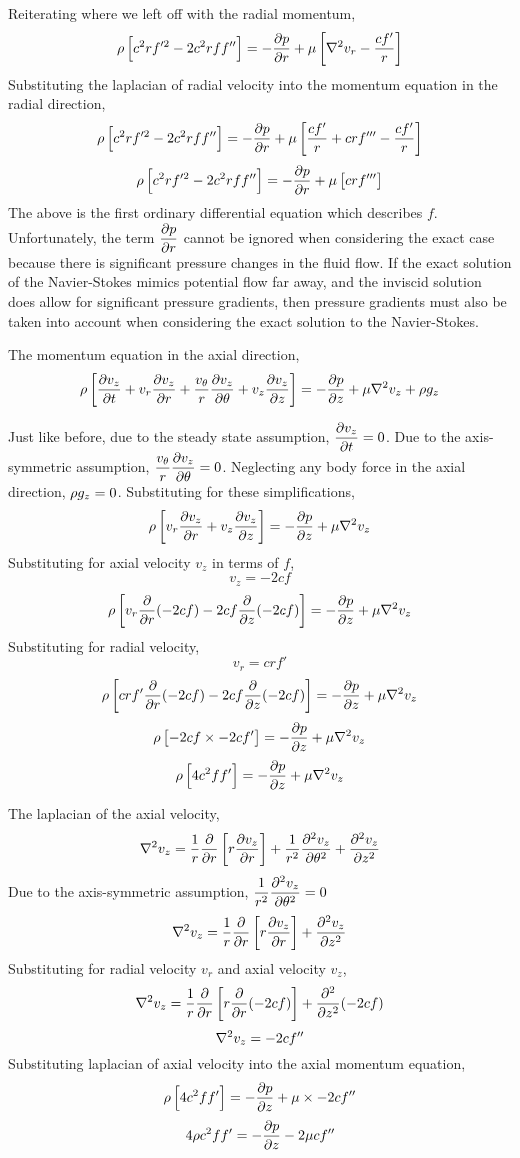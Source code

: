 \documentclass[class=report, 12pt, crop=false]{standalone}
\begin{document}
\begin{center}
Reiterating where we left off with the radial momentum,
$$\rho\left[c^2rf'^2 - 2c^2rff''\right] = -\frac{\partial p}{\partial r} + \mu\left[\nabla^2v_r - \frac{cf'}{r}\right]$$
Substituting the laplacian of radial velocity into the momentum equation in the radial direction,
$$\rho\left[c^2rf'^2 - 2c^2rff''\right] = -\frac{\partial p}{\partial r} + \mu\left[\frac{cf'}{r} + crf''' - \frac{cf'}{r}\right]$$
$$\rho\left[c^2rf'^2 - 2c^2rff''\right] = -\frac{\partial p}{\partial r} + \mu\left[crf'''\right]$$ %
The above is the first ordinary differential equation which describes $f$. Unfortunately, the term $\displaystyle{\frac{\partial p}{\partial r}}$ cannot be ignored when considering the exact case because there is significant pressure changes in the fluid flow. If the exact solution of the Navier-Stokes mimics potential flow far away, and the inviscid solution does allow for significant pressure gradients, then pressure gradients must also be taken into account when considering the exact solution to the Navier-Stokes. 



The momentum equation in the axial direction,
$$\rho\left[\frac{\partial v_z}{\partial t} + v_r\frac{\partial v_z}{\partial r} + \frac{v_\theta}{r}\frac{\partial v_z}{\partial \theta} + v_z\frac{\partial v_z}{\partial z}\right] = - \frac{\partial p}{\partial z} + \mu\nabla^2v_z + \rho g_z$$

Just like before, due to the steady state assumption, $\displaystyle{\frac{\partial v_z}{\partial t}=0}$. Due to the axis-symmetric assumption, $\displaystyle{\frac{v_\theta}{r}\frac{\partial v_z}{\partial\theta}=0}$. Neglecting any body force in the axial direction, $\displaystyle{\rho g_z=0}$. Substituting for these simplifications,
$$\rho\left[ v_r\frac{\partial v_z}{\partial r} + v_z\frac{\partial v_z}{\partial z}\right] = - \frac{\partial p}{\partial z} + \mu\nabla^2v_z$$
Substituting for axial velocity $v_z$ in terms of $f$,
$$v_z = -2cf$$
$$\rho\left[ v_r\frac{\partial }{\partial r}(-2cf) - 2cf\frac{\partial }{\partial z}(-2cf)\right] = - \frac{\partial p}{\partial z} + \mu\nabla^2v_z$$
Substituting for radial velocity,
$$v_r =  crf'$$
$$\rho\left[ crf'\frac{\partial }{\partial r}(-2cf) - 2cf\frac{\partial }{\partial z}(-2cf)\right] = - \frac{\partial p}{\partial z} + \mu\nabla^2v_z$$
$$\rho\left[ - 2cf\times -2cf'\right] = - \frac{\partial p}{\partial z} + \mu\nabla^2v_z$$
$$\rho\left[4c^2ff'\right] = - \frac{\partial p}{\partial z} + \mu\nabla^2v_z$$

The laplacian of the axial velocity,
$$\nabla^2 v_z = \frac{1}{r}\frac{\partial }{\partial r}\left[r\frac{\partial v_z}{\partial r}\right] + \frac{1}{r^2}\frac{\partial^2 v_z}{\partial \theta^2} + \frac{\partial^2 v_z}{\partial z^2}$$
Due to the axis-symmetric assumption, $\displaystyle{\frac{1}{r^2}\frac{\partial^2 v_z}{\partial\theta^2}=0}$
$$\nabla^2 v_z = \frac{1}{r}\frac{\partial }{\partial r}\left[r\frac{\partial v_z}{\partial r}\right] + \frac{\partial^2 v_z}{\partial z^2}$$
Substituting for radial velocity $v_r$ and axial velocity $v_z$,
$$\nabla^2 v_z = \frac{1}{r}\frac{\partial }{\partial r}\left[r\frac{\partial }{\partial r}(-2cf)\right] + \frac{\partial^2 }{\partial z^2}(-2cf)$$
$$\nabla^2 v_z =  -2cf''$$
Substituting laplacian of axial velocity into the axial momentum equation,
$$\rho\left[4c^2ff'\right] = - \frac{\partial p}{\partial z} + \mu\times-2cf''$$
$$4\rho c^2ff' = - \frac{\partial p}{\partial z} - 2\mu cf''$$ %


\end{center}
\end{document}

